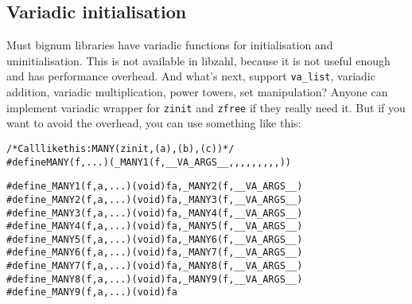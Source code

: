 \subsection{Variadic initialisation}
\label{sec:Variadic initialisation}

Must bignum libraries have variadic functions
for initialisation and uninitialisation. This
is not available in libzahl, because it is
not useful enough and has performance overhead.
And what's next, support {\tt va\_list},
variadic addition, variadic multiplication,
power towers, set manipulation? Anyone can
implement variadic wrapper for {\tt zinit} and
{\tt zfree} if they really need it. But if
you want to avoid the overhead, you can use
something like this:

\begin{alltt}
   /* \textrm{Call like this:} MANY(zinit, (a), (b), (c)) */
   #define MANY(f, ...)  (_MANY1(f, __VA_ARGS__,,,,,,,,,))
   
   #define _MANY1(f, a, ...)  (void)f a, _MANY2(f, __VA_ARGS__)
   #define _MANY2(f, a, ...)  (void)f a, _MANY3(f, __VA_ARGS__)
   #define _MANY3(f, a, ...)  (void)f a, _MANY4(f, __VA_ARGS__)
   #define _MANY4(f, a, ...)  (void)f a, _MANY5(f, __VA_ARGS__)
   #define _MANY5(f, a, ...)  (void)f a, _MANY6(f, __VA_ARGS__)
   #define _MANY6(f, a, ...)  (void)f a, _MANY7(f, __VA_ARGS__)
   #define _MANY7(f, a, ...)  (void)f a, _MANY8(f, __VA_ARGS__)
   #define _MANY8(f, a, ...)  (void)f a, _MANY9(f, __VA_ARGS__)
   #define _MANY9(f, a, ...)  (void)f a
\end{alltt}
